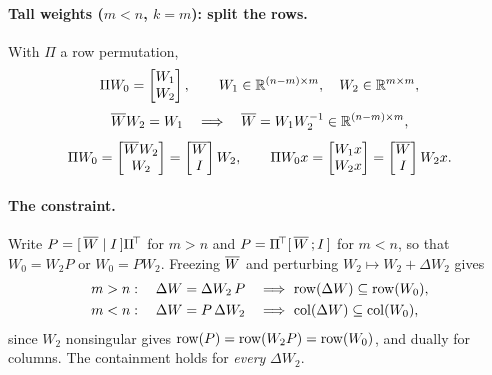 \paragraph{Tall weights ($m<n$, $k=m$): split the rows.}
With $\Pi$ a row permutation,
\begin{equation}
  \Pi W_0=\begin{bmatrix}W_1\\ W_2\end{bmatrix},\qquad
  W_1\in\mathbb{R}^{(n-m)\times m},\quad W_2\in\mathbb{R}^{m\times m},
  \label{eq:m-split-tall}
\end{equation}
\begin{equation}
  \overline{W} W_2=W_1
  \quad\Longrightarrow\quad
  \overline{W}=W_1W_2^{-1}\in\mathbb{R}^{(n-m)\times m},
  \label{eq:m-solve-tall}
\end{equation}
\begin{equation}
  \Pi W_0=\begin{bmatrix}\overline{W} W_2\\ W_2\end{bmatrix}
        =\begin{bmatrix}\overline{W}\\ I\end{bmatrix}W_2,
  \qquad
  \Pi W_0x=\begin{bmatrix}W_1x\\ W_2x\end{bmatrix}
          =\begin{bmatrix}\overline{W}\\ I\end{bmatrix}W_2x .
  \label{eq:m-tall}
\end{equation}

\paragraph{The constraint.}
Write $P=[\,\overline{W}\mid I\,]\Pi^{\!\top}$ for $m>n$ and
$P=\Pi^{\!\top}[\,\overline{W}\,;I\,]$ for $m<n$, so that $W_0=W_2P$ or $W_0=PW_2$.
Freezing $\overline{W}$ and perturbing $W_2\mapsto W_2+\Delta W_2$ gives
\begin{align}
  m>n:\quad \Delta W&=\Delta W_2\,P
    && \Longrightarrow\ \operatorname{row}(\Delta W)\subseteq\operatorname{row}(W_0),
    \label{eq:m-row}\\
  m<n:\quad \Delta W&=P\,\Delta W_2
    && \Longrightarrow\ \operatorname{col}(\Delta W)\subseteq\operatorname{col}(W_0),
    \label{eq:m-col}
\end{align}
since $W_2$ nonsingular gives $\operatorname{row}(P)=\operatorname{row}(W_2P)=\operatorname{row}(W_0)$, and dually
for columns. The containment holds for \emph{every} $\Delta W_2$.

